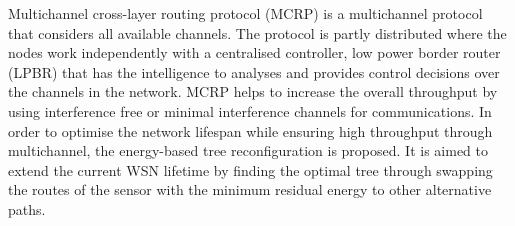 


Multichannel cross-layer routing protocol (MCRP)\cite{mcrp} is a multichannel protocol that considers all available channels. The protocol is partly distributed where the nodes work independently with a centralised controller, low power border router (LPBR) that has the intelligence to analyses and provides control decisions over the channels in the network. MCRP helps to increase the overall throughput by using interference free or minimal interference channels for communications.
In order to optimise the network lifespan while ensuring high throughput through multichannel, the energy-based tree reconfiguration is proposed. It is aimed to extend the current WSN lifetime by finding the optimal tree through swapping the routes of the sensor with the minimum residual energy to other alternative paths. 

